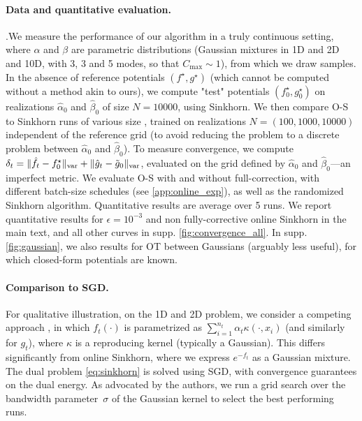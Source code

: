 \paragraph{Data and quantitative evaluation.}\label{sec:online_exp}.We measure the performance of our algorithm in a
truly continuous setting, where $\alpha$ and $\beta$ are  parametric
distributions (Gaussian mixtures in 1D and 2D and 10D, with 3, 3 and 5 modes, so
that $C_{\max} \sim 1$), from which we draw samples. In the absence of reference
potentials $(f^\star, g^\star)$ (which cannot be computed without a method akin
to ours), we compute "test" potentials $(f^\star_0, g^\star_0)$ on realizations $\hat
\alpha_0$ and $\hat \beta_0$ of size $N=10000$, using Sinkhorn. We then compare
O-S to Sinkhorn runs of various size , trained on realizations $N=(100,1000,
10000)$ independent of the reference grid (to avoid reducing the problem to a
discrete problem between $\hat \alpha_0$ and $\hat \beta_0$). To measure
convergence, we compute $\delta_t = \Vert \hat f_t - f^\star_0 \Vert_{\text{\upshape var}} +
\Vert \hat g_t - \tilde g_0 \Vert_{\text{\upshape var}}$, evaluated on the grid defined by
$\hat \alpha_0$ and $\hat \beta_0$---an imperfect metric. We evaluate O-S with and without full-correction, with
different batch-size schedules (see \autoref{app:online_exp}), as well as the randomized Sinkhorn algorithm. Quantitative results are average over 5 runs. We report quantitative results for $\epsilon = 10^{-3}$ and non fully-corrective online Sinkhorn in the main text, and all other curves in supp. \autoref{fig:convergence_all}. In
supp. \autoref{fig:gaussian}, we also results for OT between Gaussians (arguably less useful), for which closed-form
potentials are known.

\paragraph{Comparison to SGD.}\label{sec:compare}
%
For qualitative illustration, on the 1D and 2D problem, we consider a competing
approach \citep{2016-genevay-nips}, in which $f_t(\cdot)$ is parametrized as
$\sum_{i=1}^{n_t} \alpha_t \kappa(\cdot, x_i)$ (and similarly for $g_t$), where
$\kappa$ is a reproducing kernel (typically a Gaussian). This differs
significantly from online Sinkhorn, where we express $e^{-f_t}$ as a Gaussian
mixture. The dual problem \eqref{eq:sinkhorn} is solved using SGD, with convergence guarantees on the dual energy.  As advocated
by the authors, we run a grid search over the bandwidth parameter~$\sigma$ of
the Gaussian kernel to select the best performing runs. 


